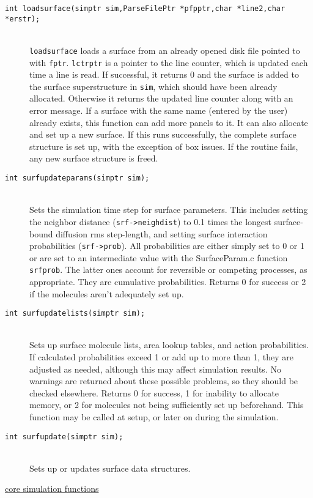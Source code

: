 \documentclass {scrbook}
\newcommand {\ttt} {\texttt}
\begin{document}
\begin{description}
\item[\ttt{int loadsurface(simptr sim,ParseFilePtr *pfpptr,char *line2,char *erstr);}]
\hfill \\
\ttt{loadsurface} loads a surface from an already opened disk file pointed to with \ttt{fptr}. \ttt{lctrptr} is a pointer to the line counter, which is updated each time a line is read. If successful, it returns 0 and the surface is added to the surface superstructure in \ttt{sim}, which should have been already allocated. Otherwise it returns the updated line counter along with an error message. If a surface with the same name (entered by the user) already exists, this function can add more panels to it. It can also allocate and set up a new surface. If this runs successfully, the complete surface structure is set up, with the exception of box issues. If the routine fails, any new surface structure is freed.

\item[\ttt{int surfupdateparams(simptr sim);}]
\hfill \\
Sets the simulation time step for surface parameters. This includes setting the neighbor distance (\ttt{srf->neighdist}) to 0.1 times the longest surface-bound diffusion rms step-length, and setting surface interaction probabilities (\ttt{srf->prob}). All probabilities are either simply set to 0 or 1 or are set to an intermediate value with the SurfaceParam.c function \ttt{srfprob}. The latter ones account for reversible or competing processes, as appropriate. They are cumulative probabilities. Returns 0 for success or 2 if the molecules aren't adequately set up.

\item[\ttt{int surfupdatelists(simptr sim);}]
\hfill \\
Sets up surface molecule lists, area lookup tables, and action probabilities. If calculated probabilities exceed 1 or add up to more than 1, they are adjusted as needed, although this may affect simulation results. No warnings are returned about these possible problems, so they should be checked elsewhere. Returns 0 for success, 1 for inability to allocate memory, or 2 for molecules not being sufficiently set up beforehand. This function may be called at setup, or later on during the simulation.

\item[\ttt{int surfupdate(simptr sim);}]
\hfill \\
Sets up or updates surface data structures.

\item[\underline{core simulation functions}]


\end{description}
\end{document}
